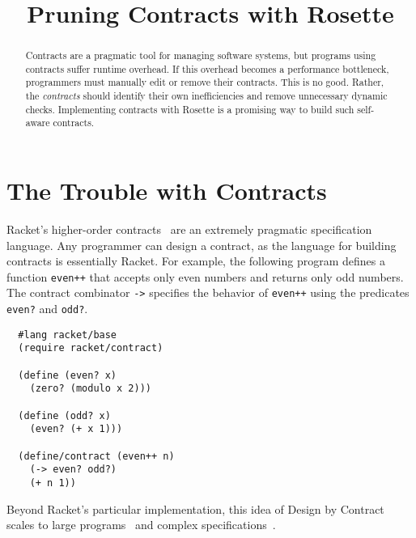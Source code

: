 \documentclass[preprint,9pt]{sigplanconf}
\title{Pruning Contracts with Rosette}
\begin{document}
\maketitle

\begin{abstract}
  Contracts are a pragmatic tool for managing software systems, but programs using contracts suffer runtime overhead.
  If this overhead becomes a performance bottleneck, programmers must manually edit or remove their contracts.
  This is no good.
  Rather, the \emph{contracts} should identify their own inefficiencies and remove unnecessary dynamic checks.
  Implementing contracts with Rosette is a promising way to build such self-aware contracts.
\end{abstract}



\section{The Trouble with Contracts}

Racket's higher-order contracts~\cite{ff-icfp-2002} are an extremely pragmatic specification language.
Any programmer can design a contract, as the language for building contracts is essentially Racket.
For example, the following program defines a function {\tt even++} that accepts only even numbers and returns only odd numbers.
The contract combinator {\tt ->} specifies the behavior of {\tt even++} using the predicates {\tt even?} and {\tt odd?}.

\begin{verbatim}
  #lang racket/base
  (require racket/contract)

  (define (even? x)
    (zero? (modulo x 2)))

  (define (odd? x)
    (even? (+ x 1)))

  (define/contract (even++ n)
    (-> even? odd?)
    (+ n 1))
\end{verbatim}

\noindent Beyond Racket's particular implementation, this idea of Design by Contract~\cite{m-ieee-1992} scales to large programs~\cite{bjpw-eptcs-2010} and complex specifications~\cite{dnff-icfp-2016}.
\end{document}
